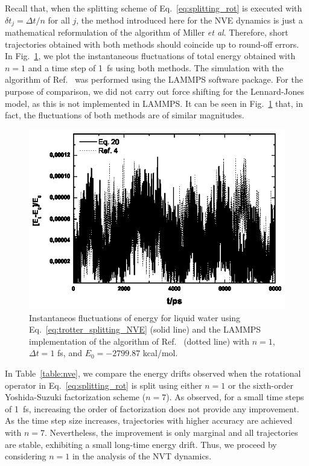 \documentclass[aip,jcp,reprint,amsmath,amssymb,raggedbottom]{revtex4-1}
\begin{document}
Recall that, when the splitting scheme of Eq.~\ref{eq:splitting_rot} is executed with $\delta t_j = \Delta t/n$ for all $j$, the method introduced here for the NVE dynamics is just a mathematical reformulation of the algorithm of Miller \textit{et al}.\cite{Miller2002} Therefore, short trajectories obtained with both methods should coincide up to round-off errors. In Fig.~\ref{fig:miller1fs}, we plot the instantaneous fluctuations of total energy obtained with $n = 1$ and a time step of 1~fs using both methods. The simulation with the algorithm of Ref.~ was performed using the LAMMPS software package.\cite{Plimpton1995} For the purpose of comparison, we did not carry out force shifting for the Lennard-Jones model, as this is not implemented in LAMMPS. It can be seen in Fig.~\ref{fig:miller1fs} that, in fact, the fluctuations of both methods are of similar magnitudes.

\begin{figure}
	\includegraphics{millerourmd}
	\caption{Instantaneos fluctuations of energy for liquid water using Eq.~\ref{eq:trotter_splitting_NVE} (solid line) and the LAMMPS implementation of the algorithm of Ref.~ (dotted line) with $n = 1$, $\Delta t = 1$ fs, and $E_0 = -2799.87$ kcal/mol.}
	\label{fig:miller1fs}
\end{figure}

In Table~\ref{table:nve}, we compare the energy drifts observed when the rotational operator in Eq.~\ref{eq:splitting_rot} is split using either $n = 1$ or the sixth-order Yoshida-Suzuki factorization scheme ($n = 7$). As observed, for a small time steps of 1~fs, increasing the order of factorization does not provide any improvement. As the time step size increases, trajectories with higher accuracy are achieved with $n = 7$. Nevertheless, the improvement is only marginal and all trajectories are stable, exhibiting a small long-time energy drift. Thus, we proceed by considering $n = 1$ in the analysis of the NVT dynamics.
\end{document}
